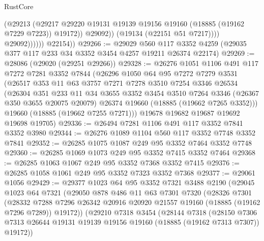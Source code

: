 \begin{lexlean}{RustCore}
\begin{coremodule}
                            (@29213
                              (@29217
                                @29220
                                @19131
                                @19139
                                @19156
                                @19160
                                (@18885 (@19162 @7229 @7223))
                                @19172))
                            @29092))
                        (@19134 (@22151 @51 @7217))))
                    @29092))))))
        @22154))
@29266 := @29029
    @560
    @117
    @3352
    @4259
    (@29035 @377 @117 @233 @34 @3352 @3454 @4257 @19211 @26374 @22174)
@29269 := @28086 (@29020 (@29251 @29266))
@29328 := @26276
    @1051
    @1106
    @491
    @117
    @7272
    @7281
    @3352
    @7844
    (@26296
      @1050
      @64
      @95
      @7272
      @7279
      @3531
      (@26517
        @353
        @11
        @63
        @3757
        @7271
        @7278
        @3510
        @7254
        @3346
        @26534
        (@26304
          @351
          @233
          @11
          @34
          @3655
          @3352
          @3454
          @3510
          @7264
          @3346
          (@26367 @350 @3655 @20075 @20079)
          @26374
          @19660
          (@18885 (@19662 @7265 @3352)))
        @19660
        (@18885 (@19662 @7255 @7271)))
      @19678
      @19682
      @19687
      @19692
      @19698
      @19705)
@29336 := @26494 @7281 @1106 @491 @117 @3352 @7841 @3352 @3980
@29344 := @26276 @1089 @1104 @560 @117 @3352 @7748 @3352 @7841
@29352 := @26285 @1075 @1087 @249 @95 @3352 @7464 @3352 @7748
@29360 := @26285 @1069 @1073 @249 @95 @3352 @7415 @3352 @7464
@29368 := @26285 @1063 @1067 @249 @95 @3352 @7368 @3352 @7415
@29376 := @26285 @1058 @1061 @249 @95 @3352 @7323 @3352 @7368
@29377 := @29061 @1056
@29429 := @29377
    @1023
    @64
    @95
    @3352
    @7321
    @3488
    @2190
    (@29045
      @1023
      @64
      @7321
      (@29050
        @878
        @486
        @11
        @63
        @7301
        @7320
        (@28326
          @7301
          (@28332
            @7288
            @7296
            @26342
            @20916
            @20920
            @21557
            @19160
            (@18885 (@19162 @7296 @7289))
            @19172))
        (@29210
          @7318
          @3454
          (@28144
            @7318
            (@28150
              @7306
              @7313
              @26644
              @19131
              @19139
              @19156
              @19160
              (@18885 (@19162 @7313 @7307))
              @19172))

\end{coremodule}
\end{lexlean}
